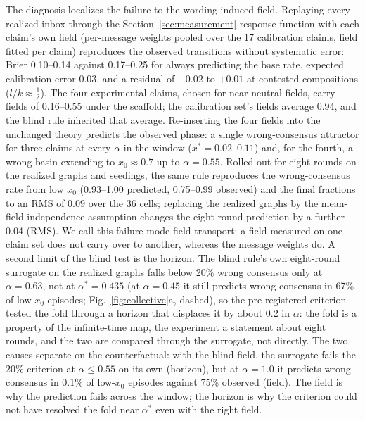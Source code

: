 \documentclass[9pt,twocolumn]{extarticle}
\newcommand{\astar}{\alpha^{*}}
\begin{document}
The diagnosis localizes the failure to the wording-induced field. Replaying
every realized inbox through the Section~\ref{sec:measurement} response
function with each claim's own field (per-message weights pooled over the 17
calibration claims, field fitted per claim) reproduces the observed
transitions without systematic error: Brier 0.10--0.14 against 0.17--0.25 for
always predicting the base rate, expected calibration error 0.03, and a
residual of $-0.02$ to $+0.01$ at contested compositions
($l/k \approx \tfrac12$). The four experimental claims, chosen for
near-neutral fields, carry fields of 0.16--0.55 under the scaffold; the
calibration set's fields average 0.94, and the blind rule inherited that
average. Re-inserting the four fields into the unchanged theory predicts the
observed phase: a single wrong-consensus attractor for three claims at every
$\alpha$ in the window ($x^* = 0.02$--$0.11$) and, for the fourth, a wrong
basin extending to $x_0 \approx 0.7$ up to $\alpha = 0.55$. Rolled out for
eight rounds on the realized graphs and seedings, the same rule reproduces
the wrong-consensus rate from low $x_0$ (0.93--1.00 predicted, 0.75--0.99
observed) and the final fractions to an RMS of 0.09 over the 36 cells;
replacing the realized graphs by the mean-field independence assumption
changes the eight-round prediction by a further 0.04 (RMS). We call this
failure mode field transport: a field measured on one claim set does not
carry over to another, whereas the message weights do. A second limit of the
blind test is the horizon. The blind rule's own eight-round surrogate on the
realized graphs falls below 20\% wrong consensus only at $\alpha = 0.63$, not
at $\astar = 0.435$ (at $\alpha = 0.45$ it still predicts wrong consensus in
67\% of low-$x_0$ episodes; Fig.~\ref{fig:collective}a, dashed), so the
pre-registered criterion tested the fold through a horizon that displaces it
by about 0.2 in $\alpha$: the fold is a property of the infinite-time map,
the experiment a statement about eight rounds, and the two are compared
through the surrogate, not directly. The two causes separate on the
counterfactual: with the blind field, the surrogate fails the 20\% criterion
at $\alpha \le 0.55$ on its own (horizon), but at $\alpha = 1.0$ it predicts
wrong consensus in 0.1\% of low-$x_0$ episodes against 75\% observed (field).
The field is why the prediction fails across the window; the horizon is why
the criterion could not have resolved the fold near $\astar$ even with the
right field.
\end{document}
